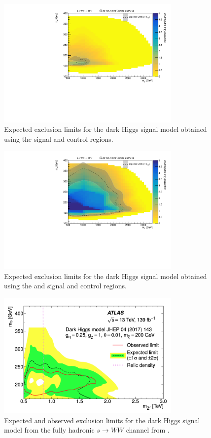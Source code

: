 \begin{figure}[h]
    \centering
    \includegraphics[width=0.8\textwidth]{Figures/5/fits/RESOLVED.pdf}
    \caption{Expected exclusion limits for the dark Higgs signal model obtained using the \resolved signal and control regions.}
    \label{fig:excl_res}
\end{figure}

\begin{figure}[h]
    \centering
    \includegraphics[width=0.8\textwidth]{Figures/5/fits/COMBO.pdf}
    \caption{Expected exclusion limits for the dark Higgs signal model obtained using the \merged and \resolved signal and control regions.}
    \label{fig:excl_comb}
\end{figure}

\begin{figure}[h]
    \centering
    \includegraphics[width=0.8\textwidth]{Figures/5/had_analy_contour.png}
    \caption{Expected and observed exclusion limits for the dark Higgs signal model from the fully hadronic $s\rightarrow WW$ channel from \cite{had_analy}.}
    \label{fig:had_sens}
\end{figure}
